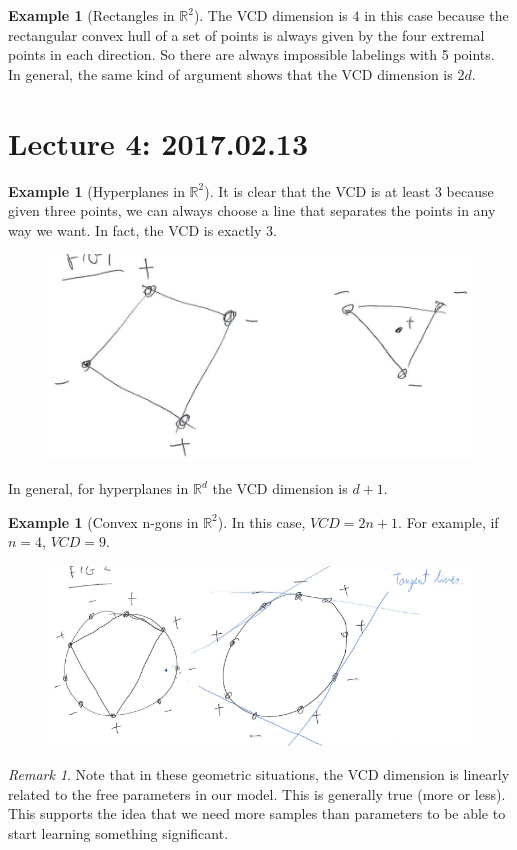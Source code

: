 \documentclass[12pt, letterpaper]{article}
\numberwithin{equation}{section} %
\newcommand{\R}{\mathbb{R}}
\theoremstyle{definition}
\newtheorem{example}[theorem]{Example}
\theoremstyle{remark}
\newtheorem{remark}[theorem]{Remark}
\begin{document}
\begin{example}[Rectangles in $\R^2$]
    The VCD dimension is $4$ in this case because the rectangular convex hull of a set of points is always given by the four extremal points in each direction. So there are always impossible labelings with 5 points. In general, the same kind of argument shows that the VCD dimension is $2d$.
\end{example}


\section{Lecture 4: 2017.02.13}

\begin{example}[Hyperplanes in $\R^2$]
    It is clear that the VCD is at least 3 because given three points, we can always choose a line that separates the points in any way we want. In fact, the VCD is exactly 3.
    \begin{figure}[H]
    \centering
    \includegraphics[width=0.3\linewidth]{../img/hyperplanes.png}
    \end{figure}
    In general, for hyperplanes in $\R^d$ the VCD dimension is $d+1$.
\end{example}

\begin{example}[Convex n-gons in $\R^2$]
    In this case, $VCD = 2n+1$. For example, if $n=4$, $VCD = 9$.
    \begin{figure}[H]
    \centering
    \includegraphics[width=0.3\linewidth]{../img/4-gons.png}
    \end{figure}
\end{example}

\begin{remark}
    Note that in these geometric situations, the VCD dimension is linearly related to the free parameters in our model. This is generally true (more or less). This supports the idea that we need more samples than parameters to be able to start learning something significant.
\end{remark}
\end{document}
